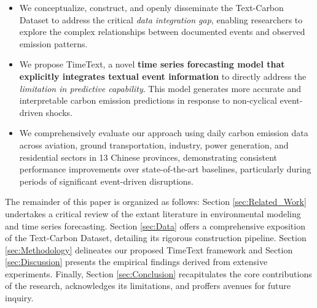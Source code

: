 \begin{itemize}
    \item We conceptualize, construct, and openly disseminate the Text-Carbon Dataset to address the critical \textit{data integration gap}, enabling researchers to explore the complex relationships between documented events and observed emission patterns.
    \item We propose TimeText, a novel \textbf{time series forecasting model that explicitly integrates textual event information} to directly address the \textit{limitation in predictive capability}. This model generates more accurate and interpretable carbon emission predictions in response to non-cyclical event-driven shocks.
    \item We comprehensively evaluate our approach using daily carbon emission data across aviation, ground transportation, industry, power generation, and residential sectors in 13 Chinese provinces, demonstrating consistent performance improvements over state-of-the-art baselines, particularly during periods of significant event-driven disruptions.
\end{itemize}

The remainder of this paper is organized as follows: Section \ref{sec:Related_Work} undertakes a critical review of the extant literature in environmental modeling and time series forecasting. Section \ref{sec:Data} offers a comprehensive exposition of the Text-Carbon Dataset, detailing its rigorous construction pipeline. Section \ref{sec:Methodology} delineates our proposed TimeText framework and Section \ref{sec:Discussion} presents the empirical findings derived from extensive experiments. Finally, Section \ref{sec:Conclusion} recapitulates the core contributions of the research, acknowledges its limitations, and proffers avenues for future inquiry.